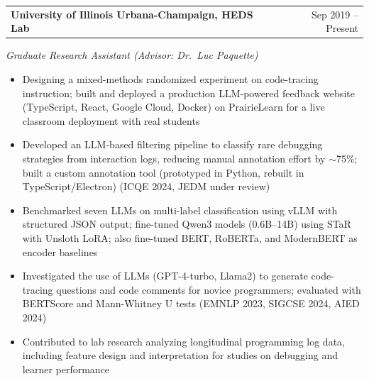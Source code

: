 \documentclass[10.5pt,letterpaper]{article}
\makeatletter
\newcommand{\entrydate}[2]{%
  \noindent\begin{tabularx}{\textwidth}{@{}X r@{}}
    \textbf{#1} & #2
  \end{tabularx}\vspace{-2pt}%
}
\newcommand{\entrysub}[1]{\noindent\textit{#1}\par}
\makeatother
\begin{document}
\entrydate{University of Illinois Urbana-Champaign, HEDS Lab}{Sep 2019 -- Present}
\entrysub{Graduate Research Assistant (Advisor: Dr.\ Luc Paquette)}
\begin{itemize}[leftmargin=14pt, nosep, topsep=2pt]
  \item Designing a mixed-methods randomized experiment on code-tracing instruction; built and deployed a production LLM-powered feedback website (TypeScript, React, Google Cloud, Docker) on PrairieLearn for a live classroom deployment with real students
  \item Developed an LLM-based filtering pipeline to classify rare debugging strategies from interaction logs, reducing manual annotation effort by \(\sim\)75\%; built a custom annotation tool (prototyped in Python, rebuilt in TypeScript/Electron) (ICQE 2024, JEDM under review)
  \item Benchmarked seven LLMs on multi-label classification using vLLM with structured JSON output; fine-tuned Qwen3 models (0.6B--14B) using STaR with Unsloth LoRA; also fine-tuned BERT, RoBERTa, and ModernBERT as encoder baselines
  \item Investigated the use of LLMs (GPT-4-turbo, Llama2) to generate code-tracing questions and code comments for novice programmers; evaluated with BERTScore and Mann-Whitney U tests (EMNLP 2023, SIGCSE 2024, AIED 2024)
  \item Contributed to lab research analyzing longitudinal programming log data, including feature design and interpretation for studies on debugging and learner performance
\end{itemize}
\vspace{3pt}
\end{document}
